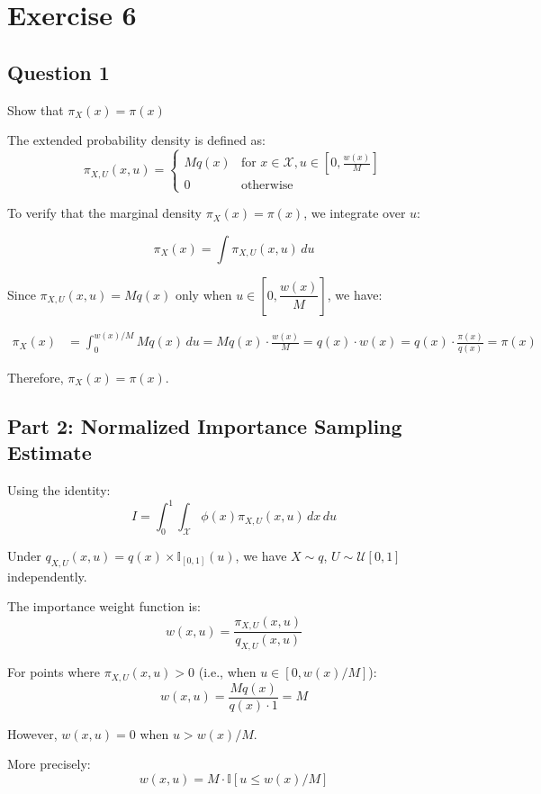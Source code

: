 \section*{Exercise 6}

\subsection*{Question 1}

Show that $\pi_X(x) = \pi(x)$

The extended probability density is defined as:
\[
\pi_{X,U}(x, u) = \begin{cases} 
Mq(x) & \text{for } x \in \mathcal{X}, u \in \left[0, \frac{w(x)}{M}\right] \\
0 & \text{otherwise}
\end{cases}
\]

To verify that the marginal density $\pi_X(x) = \pi(x)$, we integrate over $u$:

\[
\pi_X(x) = \int \pi_{X,U}(x, u) \, du
\]

Since $\pi_{X,U}(x, u) = Mq(x)$ only when $u \in [0, \dfrac{w(x)}{M}]$, we have:

\begin{align*}
\pi_X(x) &= \int_0^{w(x)/M} Mq(x) \, du 
= Mq(x) \cdot \frac{w(x)}{M} 
= q(x) \cdot w(x) 
= q(x) \cdot \frac{\pi(x)}{q(x)} 
= \pi(x)
\end{align*}

Therefore, $\pi_X(x) = \pi(x)$.

\subsection*{Part 2: Normalized Importance Sampling Estimate}

Using the identity:
\[
I = \int_0^1 \int_{\mathcal{X}} \phi(x) \pi_{X,U}(x, u) \, dx \, du
\]

Under $q_{X,U}(x, u) = q(x) \times \mathbb{I}_{[0,1]}(u)$, we have $X \sim q$, $U \sim \mathcal{U}[0,1]$ independently.

The importance weight function is:
\[
w(x, u) = \frac{\pi_{X,U}(x, u)}{q_{X,U}(x, u)}
\]

For points where $\pi_{X,U}(x, u) > 0$ (i.e., when $u \in [0, w(x)/M]$):
\[
w(x, u) = \frac{Mq(x)}{q(x) \cdot 1} = M
\]

However, $w(x, u) = 0$ when $u > w(x)/M$.

More precisely:
\[
w(x, u) = M \cdot \mathbb{I}[u \leq w(x)/M]
\]


